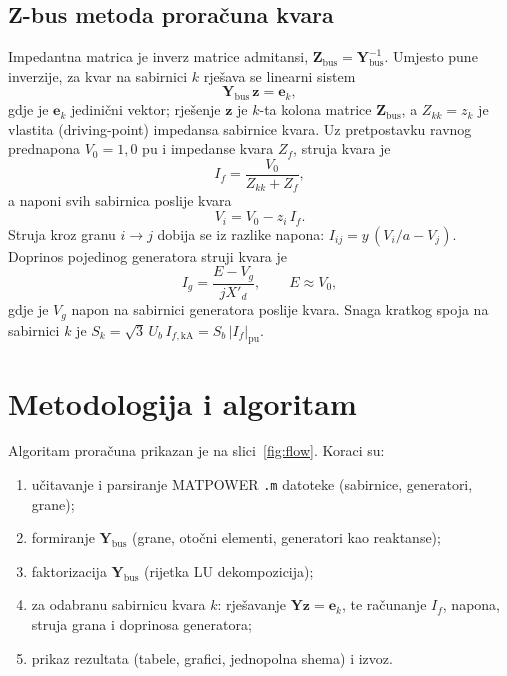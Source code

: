 \documentclass[12pt,a4paper]{article}
\begin{document}
\subsection{Z-bus metoda proračuna kvara}
Impedantna matrica je inverz matrice admitansi,
$\mathbf{Z}_{\text{bus}}=\mathbf{Y}_{\text{bus}}^{-1}$. Umjesto pune inverzije,
za kvar na sabirnici $k$ rješava se linearni sistem
\begin{equation}
\mathbf{Y}_{\text{bus}}\,\mathbf{z} = \mathbf{e}_k,
\end{equation}
gdje je $\mathbf{e}_k$ jedinični vektor; rješenje $\mathbf{z}$ je $k$-ta kolona
matrice $\mathbf{Z}_{\text{bus}}$, a $Z_{kk}=z_k$ je vlastita (driving-point)
impedansa sabirnice kvara. Uz pretpostavku ravnog prednapona $V_0=1{,}0$ pu i
impedanse kvara $Z_f$, struja kvara je
\begin{equation}
I_f = \frac{V_0}{Z_{kk}+Z_f},
\end{equation}
a naponi svih sabirnica poslije kvara
\begin{equation}
V_i = V_0 - z_i\,I_f .
\end{equation}
Struja kroz granu $i\!\to\!j$ dobija se iz razlike napona:
$I_{ij} = y\,(V_i/a - V_j)$. Doprinos pojedinog generatora struji kvara je
\begin{equation}
I_g = \frac{E - V_g}{j X'_d}, \qquad E \approx V_0,
\end{equation}
gdje je $V_g$ napon na sabirnici generatora poslije kvara. Snaga kratkog spoja
na sabirnici $k$ je $S_k = \sqrt{3}\,U_b\,I_{f,\text{kA}} = S_b\,|I_f|_{\text{pu}}$.

\section{Metodologija i algoritam}
Algoritam proračuna prikazan je na slici~\ref{fig:flow}. Koraci su:
\begin{enumerate}
  \item učitavanje i parsiranje MATPOWER \texttt{.m} datoteke (sabirnice,
  generatori, grane);
  \item formiranje $\mathbf{Y}_{\text{bus}}$ (grane, otočni elementi, generatori
  kao reaktanse);
  \item faktorizacija $\mathbf{Y}_{\text{bus}}$ (rijetka LU dekompozicija);
  \item za odabranu sabirnicu kvara $k$: rješavanje $\mathbf{Y}\mathbf{z}=\mathbf{e}_k$,
  te računanje $I_f$, napona, struja grana i doprinosa generatora;
  \item prikaz rezultata (tabele, grafici, jednopolna shema) i izvoz.
\end{enumerate}
\end{document}
